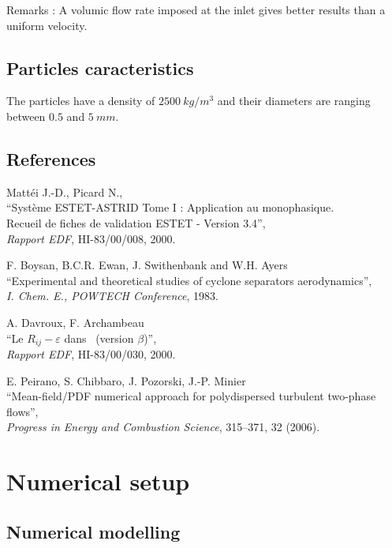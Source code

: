 Remarks : A volumic flow rate imposed at the inlet gives better results than a uniform velocity.

\subsection{Particles caracteristics}

The particles have a density of $2500~kg/m^3$ and their diameters are ranging between $0.5$ and $5~mm$.

\subsection{References}

\begin{thebibliography}{3}

 Matt\'ei J.-D., Picard N.,\\
``Syst\`eme ESTET-ASTRID Tome I : Application au monophasique.\\
Recueil de fiches de validation ESTET - Version 3.4'',\\
{\it Rapport EDF}, HI-83/00/008, 2000.

 F. Boysan, B.C.R. Ewan, J. Swithenbank and W.H. Ayers\\
``Experimental and theoretical studies of cyclone separators aerodynamics'',\\
{\it I. Chem. E., POWTECH Conference}, 1983.

 A. Davroux, F. Archambeau\\
``Le $R_{ij}-\varepsilon$ dans \CS \ (version $\beta$)'',\\
{\it Rapport EDF}, HI-83/00/030, 2000.

 E. Peirano, S. Chibbaro, J. Pozorski, J.-P. Minier \\
``Mean-field/PDF numerical approach for polydispersed turbulent two-phase flows'',\\
{\it Progress in Energy and Combustion Science}, 315–371, 32 (2006).

\end{thebibliography}

\section{Numerical setup}

\subsection{Numerical modelling}

